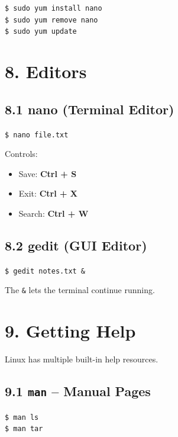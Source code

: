 \documentclass[12pt]{article}
\begin{document}
\begin{highlightbox}
\texttt{\$ sudo yum install nano}\\
\texttt{\$ sudo yum remove nano}\\
\texttt{\$ sudo yum update}
\end{highlightbox}

\section*{8. Editors}

\subsection*{8.1 nano (Terminal Editor)}

\begin{highlightbox}
\texttt{\$ nano file.txt}
\end{highlightbox}

Controls:

\begin{itemize}
    \item Save: \textbf{Ctrl + S}
    \item Exit: \textbf{Ctrl + X}
    \item Search: \textbf{Ctrl + W}
\end{itemize}

\subsection*{8.2 gedit (GUI Editor)}

\begin{highlightbox}
\texttt{\$ gedit notes.txt \&}
\end{highlightbox}

The \texttt{\&} lets the terminal continue running.

\section*{9. Getting Help}

Linux has multiple built-in help resources.

\subsection*{9.1 \texttt{man} – Manual Pages}

\begin{highlightbox}
\texttt{\$ man ls}\\
\texttt{\$ man tar}
\end{highlightbox}
\end{document}
